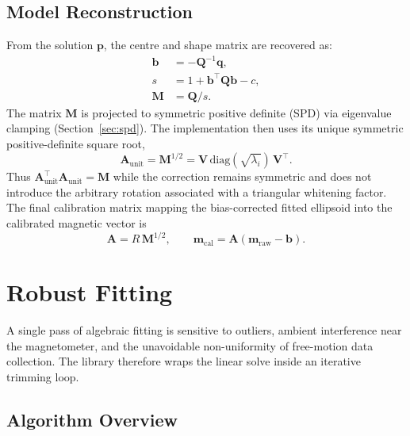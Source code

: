 \documentclass[conference]{IEEEtran}
\begin{document}
    \subsection{Model Reconstruction}

    From the solution $\mathbf{p}$, the centre and shape matrix are recovered as:
    \begin{align}
        \mathbf{b} &= -\mathbf{Q}^{-1}\mathbf{q}, \\
        s &= 1 + \mathbf{b}^\top\mathbf{Q}\mathbf{b} - c, \\
        \mathbf{M} &= \mathbf{Q}/s.
    \end{align}
    The matrix $\mathbf{M}$ is projected to symmetric positive definite (SPD)
    via eigenvalue clamping (Section~\ref{sec:spd}).  The implementation then
    uses its unique symmetric positive-definite square root,
    \begin{equation}
        \mathbf{A}_\text{unit}
        = \mathbf{M}^{1/2}
        = \mathbf{V}\,\mathrm{diag}(\sqrt{\lambda_i})\,\mathbf{V}^\top .
    \end{equation}
    Thus $\mathbf{A}_\text{unit}^\top\mathbf{A}_\text{unit}=\mathbf{M}$
    while the correction remains symmetric and does not introduce the
    arbitrary rotation associated with a triangular whitening factor.  The
    final calibration matrix mapping the bias-corrected fitted ellipsoid into
    the calibrated magnetic vector is
    \begin{equation}
        \mathbf{A} = R\,\mathbf{M}^{1/2},\qquad
        \mathbf{m}_\text{cal}=\mathbf{A}(\mathbf{m}_\text{raw}-\mathbf{b}).
    \end{equation}

    \section{Robust Fitting}
    \label{sec:robust}

    A single pass of algebraic fitting is sensitive to outliers, ambient
    interference near the magnetometer, and the unavoidable non-uniformity
    of free-motion data collection.
    The library therefore wraps the linear solve inside an iterative
    trimming loop.

    \subsection{Algorithm Overview}
\end{document}
